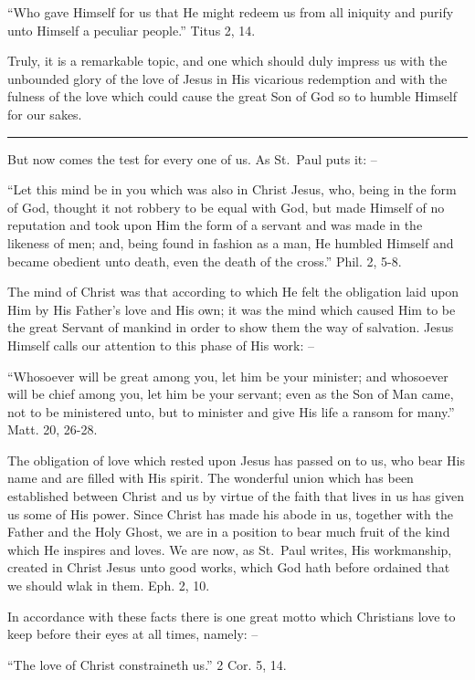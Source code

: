 \documentclass[
]{book}
\begin{document}
``Who gave Himself for us that He might redeem us from all iniquity and purify unto Himself a peculiar people.'' Titus 2, 14.

Truly, it is a remarkable topic, and one which should duly impress us with the unbounded glory of the love of Jesus in His vicarious redemption and with the fulness of the love which could cause the great Son of God so to humble Himself for our sakes.

\begin{center}\rule{0.5\linewidth}{0.5pt}\end{center}

But now comes the test for every one of us. As St.~Paul puts it: --

``Let this mind be in you which was also in Christ Jesus, who, being in the form of God, thought it not robbery to be equal with God, but made Himself of no reputation and took upon Him the form of a servant and was made in the likeness of men; and, being found in fashion as a man, He humbled Himself and became obedient unto death, even the death of the cross.'' Phil. 2, 5-8.

The mind of Christ was that according to which He felt the obligation laid upon Him by His Father's love and His own; it was the mind which caused Him to be the great Servant of mankind in order to show them the way of salvation. Jesus Himself calls our attention to this phase of His work: --

``Whosoever will be great among you, let him be your minister; and whosoever will be chief among you, let him be your servant; even as the Son of Man came, not to be ministered unto, but to minister and give His life a ransom for many.'' Matt. 20, 26-28.

The obligation of love which rested upon Jesus has passed on to us, who bear His name and are filled with His spirit. The wonderful union which has been established between Christ and us by virtue of the faith that lives in us has given us some of His power. Since Christ has made his abode in us, together with the Father and the Holy Ghost, we are in a position to bear much fruit of the kind which He inspires and loves. We are now, as St.~Paul writes, His workmanship, created in Christ Jesus unto good works, which God hath before ordained that we should wlak in them. Eph. 2, 10.

In accordance with these facts there is one great motto which Christians love to keep before their eyes at all times, namely: --

``The love of Christ constraineth us.'' 2 Cor. 5, 14.
\end{document}
